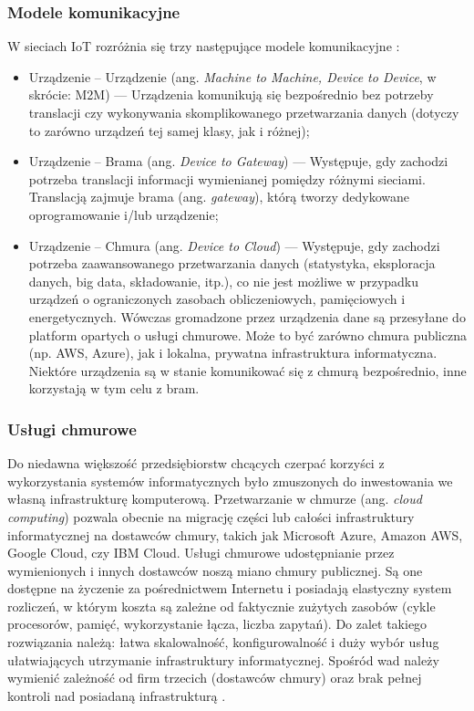 \documentclass[a4paper, 12pt, twoside]{article}
\begin{document}
\subsubsection*{Modele komunikacyjne}

W sieciach IoT rozróżnia się trzy następujące modele komunikacyjne \cite{intro-to-iot}:

\begin{itemize}
    \item Urządzenie -- Urządzenie (ang. \emph{Machine to Machine, Device to Device}, w skrócie: M2M)
    --- Urządzenia komunikują się bezpośrednio bez potrzeby translacji czy wykonywania 
    skomplikowanego przetwarzania danych (dotyczy to zarówno urządzeń tej samej klasy, jak i różnej);
    \item Urządzenie -- Brama (ang. \emph{Device to Gateway})
    --- Występuje, gdy zachodzi potrzeba translacji informacji wymienianej pomiędzy różnymi sieciami.
    Translacją zajmuje brama (ang. \emph{gateway}), którą tworzy dedykowane oprogramowanie i/lub urządzenie;
    \item Urządzenie -- Chmura (ang. \emph{Device to Cloud})
    --- Występuje, gdy zachodzi potrzeba zaawansowanego przetwarzania danych 
    (statystyka, eksploracja danych, big data, składowanie, itp.), 
    co nie jest możliwe w przypadku urządzeń o ograniczonych zasobach obliczeniowych, 
    pamięciowych i energetycznych. Wówczas gromadzone przez urządzenia dane są 
    przesyłane do platform opartych o usługi chmurowe. Może to być zarówno chmura publiczna 
    (np. AWS, Azure), jak i lokalna, prywatna infrastruktura informatyczna. 
    Niektóre urządzenia są w stanie komunikować się z chmurą bezpośrednio, inne
    korzystają w tym celu z bram.
\end{itemize}

\subsubsection{Usługi chmurowe}

Do niedawna większość przedsiębiorstw chcących czerpać korzyści z wykorzystania
systemów informatycznych było zmuszonych do inwestowania we własną infrastrukturę
komputerową. Przetwarzanie w chmurze (ang. \emph{cloud computing}) pozwala obecnie 
na migrację części lub całości infrastruktury informatycznej na dostawców chmury,
takich jak Microsoft Azure, Amazon AWS, Google Cloud, czy IBM Cloud. Usługi chmurowe
udostępnianie przez wymienionych i innych dostawców noszą miano chmury publicznej. 
Są one dostępne na życzenie za pośrednictwem Internetu i posiadają elastyczny
system rozliczeń, w którym koszta są zależne od faktycznie zużytych zasobów
(cykle procesorów, pamięć, wykorzystanie łącza, liczba zapytań). Do zalet takiego
rozwiązania należą: łatwa skalowalność, konfigurowalność i duży wybór usług
ułatwiających utrzymanie infrastruktury informatycznej. Spośród wad należy wymienić
zależność od firm trzecich (dostawców chmury) oraz brak pełnej kontroli nad 
posiadaną infrastrukturą \cite{iot-hype-to-reality}.
\end{document}
